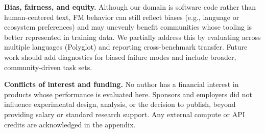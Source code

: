 \textbf{Bias, fairness, and equity.}
Although our domain is software code rather than human-centered text, FM behavior can still reflect biases (e.g., language or ecosystem preferences) and may unevenly benefit communities whose tooling is better represented in training data. We partially address this by evaluating across multiple languages (Polyglot) and reporting cross-benchmark transfer. Future work should add diagnostics for biased failure modes and include broader, community-driven task sets.

\textbf{Conflicts of interest and funding.}
No author has a financial interest in products whose performance is evaluated here. Sponsors and employers did not influence experimental design, analysis, or the decision to publish, beyond providing salary or standard research support. Any external compute or API credits are acknowledged in the appendix.
